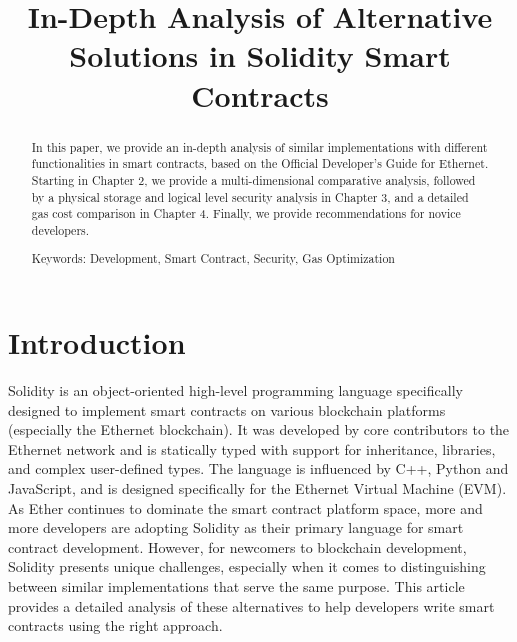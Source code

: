\documentclass[conference]{IEEEtran}
\begin{document}
\title{In-Depth Analysis of Alternative Solutions in Solidity Smart Contracts}

\author{
}

\maketitle

\begin{abstract}
In this paper, we provide an in-depth analysis of similar implementations with different functionalities in smart contracts, based on the Official Developer's Guide for Ethernet. Starting in Chapter 2, we provide a multi-dimensional comparative analysis, followed by a physical storage and logical level security analysis in Chapter 3, and a detailed gas cost comparison in Chapter 4. Finally, we provide recommendations for novice developers.

Keywords: Development, Smart Contract, Security, Gas Optimization
\end{abstract}

\section{Introduction}
Solidity is an object-oriented high-level programming language specifically designed to implement smart contracts on various blockchain platforms (especially the Ethernet blockchain). It was developed by core contributors to the Ethernet network and is statically typed with support for inheritance, libraries, and complex user-defined types\cite{wikiSolidity}. The language is influenced by C++, Python and JavaScript, and is designed specifically for the Ethernet Virtual Machine (EVM).
As Ether continues to dominate the smart contract platform space, more and more developers are adopting Solidity as their primary language for smart contract development. However, for newcomers to blockchain development, Solidity presents unique challenges, especially when it comes to distinguishing between similar implementations that serve the same purpose. This article provides a detailed analysis of these alternatives to help developers write smart contracts using the right approach.
\end{document}
